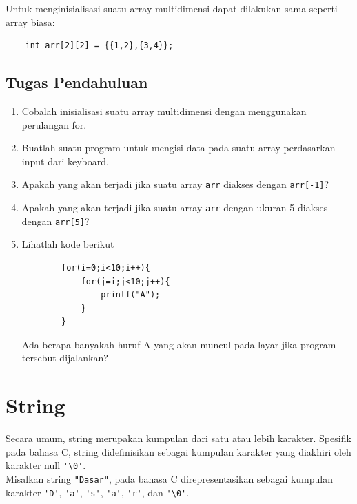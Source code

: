 Untuk menginisialisasi suatu array multidimensi dapat dilakukan sama seperti array biasa:
\begin{verbatim}
    int arr[2][2] = {{1,2},{3,4}};
\end{verbatim}

\subsection{Tugas Pendahuluan}
\begin{enumerate}
	\item Cobalah inisialisasi suatu array multidimensi dengan menggunakan perulangan for.
	\item Buatlah suatu program untuk mengisi data pada suatu array perdasarkan input dari keyboard.
	\item Apakah yang akan terjadi jika suatu array \verb|arr| diakses dengan \verb|arr[-1]|?
	\item Apakah yang akan terjadi jika suatu array \verb|arr| dengan ukuran 5 diakses dengan \verb|arr[5]|?
	\item Lihatlah kode berikut
	      \begin{verbatim}
        for(i=0;i<10;i++){
            for(j=i;j<10;j++){
                printf("A");
            }
        }
    \end{verbatim}
	      Ada berapa banyakah huruf A yang akan muncul pada layar jika program tersebut dijalankan?
\end{enumerate}

\section{String}
Secara umum, string merupakan kumpulan dari satu atau lebih karakter. Spesifik pada bahasa C, string didefinisikan sebagai kumpulan karakter yang diakhiri oleh karakter null \verb|'\0'|.
\\
Misalkan string  \verb|"Dasar"|, pada bahasa C direpresentasikan sebagai kumpulan karakter \verb|'D'|, \verb|'a'|, \verb|'s'|, \verb|'a'|, \verb|'r'|, dan \verb|'\0'|.

